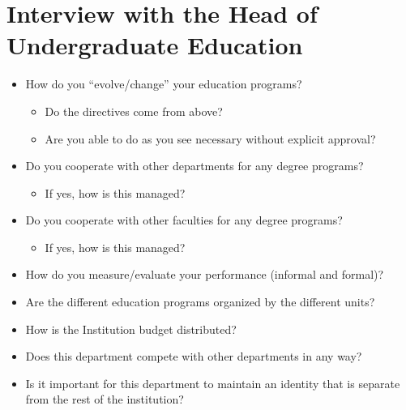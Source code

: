 \section*{Interview with the Head of Undergraduate Education}
\begin{itemize}
\item How do you ``evolve/change'' your education programs?
  \begin{itemize}
	  \item Do the directives come from above?
	  \item Are you able to do as you see necessary without explicit approval?
	\end{itemize}
\item Do you cooperate with other departments for any degree programs?
  \begin{itemize}
	  \item If yes, how is this managed?
	\end{itemize}
\item Do you cooperate with other faculties for any degree programs?
  \begin{itemize}
	  \item If yes, how is this managed?
	\end{itemize}
\item How do you measure/evaluate your performance (informal and formal)?
\item Are the different education programs organized by the different units?
\item How is the Institution budget distributed?
\item Does this department compete with other departments in any way?
\item Is it important for this department to maintain an identity that is separate from the rest of the institution?
\end{itemize}
%
%

